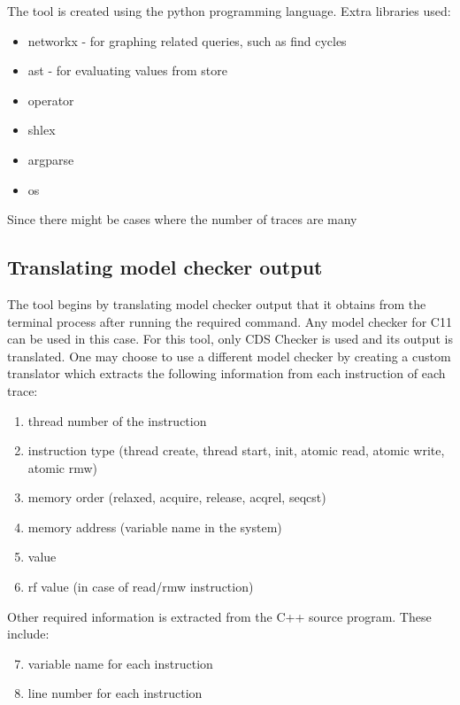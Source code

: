\par
The tool is created using the python programming language. Extra libraries used:
\begin{itemize}
	\item networkx - for graphing related queries, such as find cycles
	\item ast - for evaluating values from store
	\item operator
	\item shlex
	\item argparse
	\item os
\end{itemize}

Since there might be cases where the number of traces are many

\subsection{Translating model checker output}
The tool begins by translating model checker output that it obtains from the terminal process after running the required command. Any model checker for C11 can be used in this case. For this tool, only CDS Checker is used and its output is translated. One may choose to use a different model checker by creating a custom translator which extracts the following information from each instruction of each trace:

\begin{enumerate}
	\item thread number of the instruction
	\item instruction type (thread create, thread start, init, atomic read, atomic write, atomic rmw)
	\item memory order (relaxed, acquire, release, acq\textunderscore rel, seq\textunderscore cst)
	\item memory address (variable name in the system)
	\item value
	\item rf value (in case of read/rmw instruction)
\end{enumerate}

\par 
Other required information is extracted from the C++ source program. These include:
\begin{enumerate}
	\setcounter{enumi}{6}
	\item variable name for each instruction
	\item line number for each instruction
\end{enumerate}


